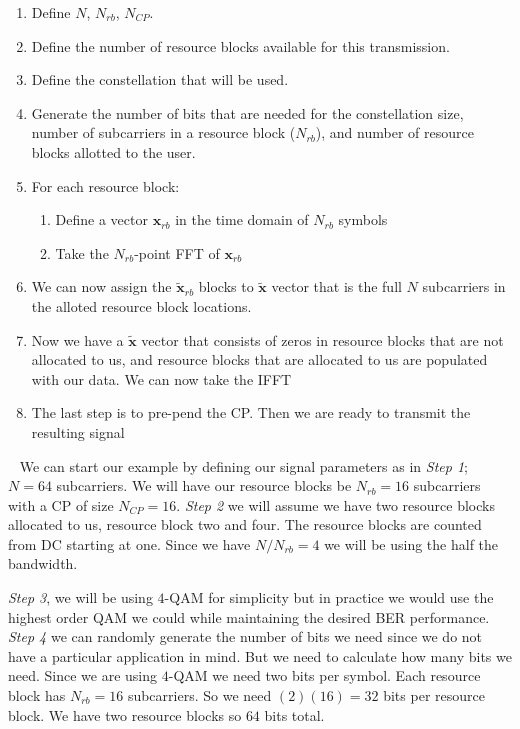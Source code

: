\begin{enumerate}
\item{Define $N$, $N_{rb}$, $N_{CP}$.}
\item{Define the number of resource blocks available for this transmission.}
\item{Define the constellation that will be used.}
\item{Generate the number of bits that are needed for the constellation size, number of subcarriers in a resource block ($N_{rb}$), and number of resource blocks allotted to the user.}
\item{For each resource block:}
 \begin{enumerate}
 \item{Define a vector $\mathbf{x}_{rb}$ in the time domain of $N_{rb}$ symbols}
 \item{Take the $N_{rb}$-point \ac{FFT} of $\mathbf{x}_{rb}$}
 \end{enumerate}
\item{We can now assign the $\tilde{\mathbf{x}}_{rb}$ blocks to $\tilde{\mathbf{x}}$ vector that is the full $N$ subcarriers in the alloted resource block locations.}
\item{Now we have a $\tilde{\mathbf{x}}$ vector that consists of zeros in resource blocks that are not allocated to us, and resource blocks that are allocated to us are populated with our data. We can now take the \ac{IFFT}} 
\item{The last step is to pre-pend the \ac{CP}. Then we are ready to transmit the resulting signal}
\end{enumerate}
 
We can start our example by defining our signal parameters as in \emph{Step 1}; $N=64$ subcarriers. We will have our resource blocks be $N_{rb} = 16$ subcarriers with a \ac{CP} of size $N_{CP}=16$. \emph{Step 2} we will assume we have two resource blocks allocated to us, resource block two and four. The resource blocks are counted from \ac{DC} starting at one. Since we have $N/N_{rb}=4$ we will be using the half the bandwidth.

\emph{Step 3}, we will be using $4$-\ac{QAM} for simplicity but in practice we would use the highest order \ac{QAM} we could while maintaining the desired \ac{BER} performance. \emph{Step 4} we can randomly generate the number of bits we need since we do not have a particular application in mind. But we need to calculate how many bits we need. Since we are using $4$-\ac{QAM} we need two bits per symbol. Each resource block has $N_{rb} = 16$ subcarriers. So we need $(2)(16)=32$ bits per resource block. We have two resource blocks so $64$ bits total.

